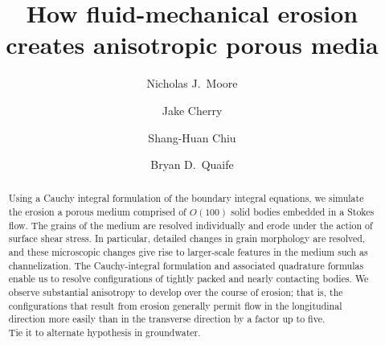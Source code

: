 \documentclass[3p]{elsarticle}
\begin{document}
\title{How fluid-mechanical erosion creates anisotropic porous media}



\author[Colgate]{Nicholas J.~Moore}

\author[FSU]{Jake Cherry}

\author[NJIT]{Shang-Huan Chiu}

\author[FSU]{Bryan D.~Quaife}

\address[Colgate]{Colgate University}
\address[FSU]{Florida State University}
\address[NJIT]{New Jersey Institute of Technology}

\begin{abstract}
Using a Cauchy integral formulation of the boundary integral equations, we simulate the erosion a porous medium comprised of $O(100)$ solid bodies embedded in a Stokes flow. The grains of the medium are resolved individually and erode under the action of surface shear stress. In particular, detailed changes in grain morphology are resolved, and these microscopic changes give rise to larger-scale features in the medium such as channelization. The Cauchy-integral formulation and associated quadrature formulas enable us to resolve configurations of tightly packed and nearly contacting bodies. We observe substantial anisotropy to develop over the course of erosion; that is, the configurations that result from erosion generally permit flow in the longitudinal direction more easily than in the transverse direction by a factor up to five.  \\
Tie it to alternate hypothesis in groundwater.
\end{abstract}
\maketitle

\end{document}
